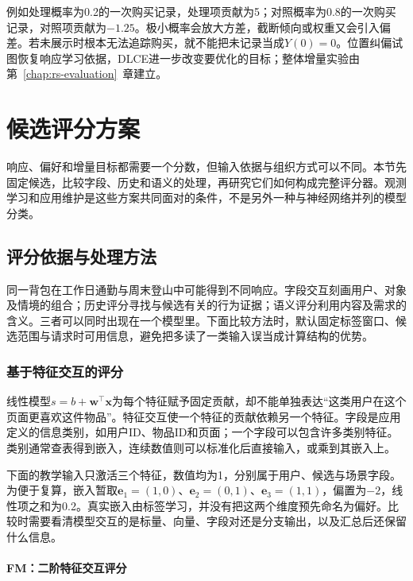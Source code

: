 例如处理概率为0.2的一次购买记录，处理项贡献为5；对照概率为0.8的一次购买记录，对照项贡献为$-1.25$。极小概率会放大方差，截断倾向或权重又会引入偏差。若未展示时根本无法追踪购买，就不能把未记录当成$Y(0)=0$。位置纠偏试图恢复响应学习依据，DLCE进一步改变要优化的目标；整体增量实验由第~\ref{chap:rs-evaluation}~章建立。

\section{候选评分方案}
\label{sec:rs-scoring}

响应、偏好和增量目标都需要一个分数，但输入依据与组织方式可以不同。本节先固定候选，比较字段、历史和语义的处理，再研究它们如何构成完整评分器。观测学习和应用维护是这些方案共同面对的条件，不是另外一种与神经网络并列的模型分类。

\subsection{评分依据与处理方法}
\label{sec:rs-scoring-evidence}

同一背包在工作日通勤与周末登山中可能得到不同响应。字段交互刻画用户、对象及情境的组合；历史评分寻找与候选有关的行为证据；语义评分利用内容及需求的含义。三者可以同时出现在一个模型里。下面比较方法时，默认固定标签窗口、候选范围与请求时可用信息，避免把多读了一类输入误当成计算结构的优势。

\subsubsection{基于特征交互的评分}
\label{sec:rs-feature-interaction}

线性模型$s=b+\bm w^\top\bm x$为每个特征赋予固定贡献，却不能单独表达“这类用户在这个页面更喜欢这件物品”。特征交互使一个特征的贡献依赖另一个特征。字段是应用定义的信息类别，如用户ID、物品ID和页面；一个字段可以包含许多类别特征。类别通常查表得到嵌入，连续数值则可以标准化后直接输入，或乘到其嵌入上。

下面的教学输入只激活三个特征，数值均为1，分别属于用户、候选与场景字段。为便于复算，嵌入暂取$\bm e_1=(1,0)$、$\bm e_2=(0,1)$、$\bm e_3=(1,1)$，偏置为$-2$，线性项之和为0.2。真实嵌入由标签学习，并没有把这两个维度预先命名为偏好。比较时需要看清模型交互的是标量、向量、字段对还是分支输出，以及汇总后还保留什么信息。

\paragraph{FM：二阶特征交互评分}
\label{sec:rs-fm}

